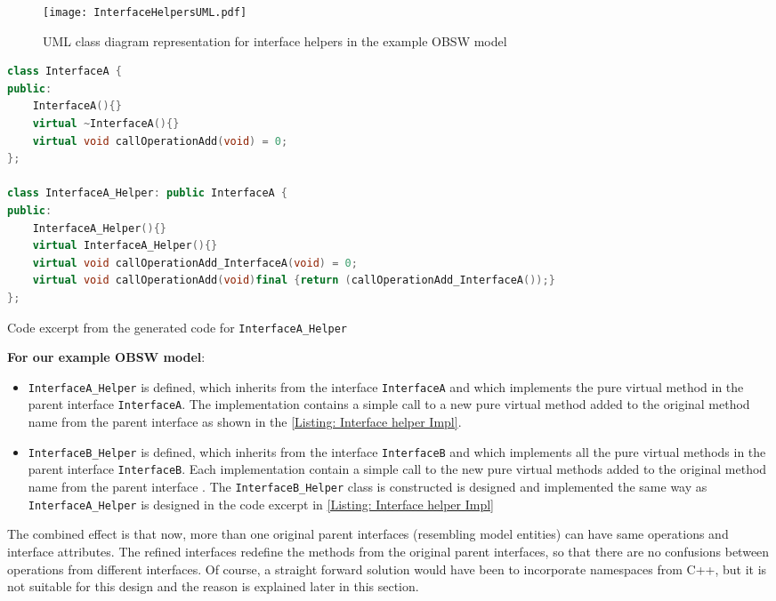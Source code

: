 \begin{figure}[h]
	\centering
	\texttt{[image: InterfaceHelpersUML.pdf]}
	\caption{UML class diagram representation for interface helpers in the example OBSW model}
	\label{fig: Interface helpers UML}
\end{figure}

\begin{Listing}
\begin{lstlisting}[language=C++]
class InterfaceA {
public:
	InterfaceA(){}
	virtual ~InterfaceA(){}
	virtual void callOperationAdd(void) = 0;
};

class InterfaceA_Helper: public InterfaceA {
public:
	InterfaceA_Helper(){}
	virtual InterfaceA_Helper(){}
	virtual void callOperationAdd_InterfaceA(void) = 0;
	virtual void callOperationAdd(void)final {return (callOperationAdd_InterfaceA());}
};
\end{lstlisting}
\caption{Code excerpt from the generated code for \texttt{InterfaceA\allowbreak\_Helper}}
\label{Listing: Interface helper Impl}
\end{Listing}

\textbf{For our example OBSW model}:
\begin{itemize}
\item \texttt{InterfaceA\allowbreak\_Helper} is defined, which inherits from the interface \texttt{InterfaceA} and which implements the pure virtual method in the parent interface \texttt{InterfaceA}. The implementation contains a simple call to a new pure virtual method added to the original method name from the parent interface as shown in the \cref{Listing: Interface helper Impl}.

\item \texttt{InterfaceB\allowbreak\_Helper} is defined, which inherits from the interface \texttt{InterfaceB} and which implements all the pure virtual methods in the parent interface \texttt{InterfaceB}. Each implementation contain a simple call to the new pure virtual methods added to the original method name from the parent interface . The \texttt{InterfaceB\allowbreak\_Helper} class is constructed is designed and implemented the same way as \texttt{InterfaceA\allowbreak\_Helper} is designed in the code excerpt in \cref{Listing: Interface helper Impl}   
\end{itemize}

The combined effect is that now, more than one original parent interfaces (resembling model entities) can have same operations and interface attributes. The refined interfaces redefine the methods from the original parent interfaces, so that there are no confusions between operations from different interfaces. Of course, a straight forward solution would have been to incorporate namespaces from C++, but it is not suitable for this design and the reason is explained later in this section. 

